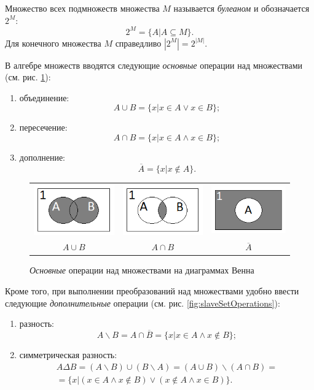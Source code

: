 Множество всех подмножеств множества $M$ называется \emph{булеаном} и обозначается $2^M$:
\[2^M=\{A|A\subseteq M\}.\]
Для конечного множества $M$ справедливо $\left|2^M\right|=2^{\left|M\right|}$.

В алгебре множеств вводятся следующие \emph{основные} операции над множествами (см. рис. \ref{fig:mainSetOperations}):
\begin{enumerate}
    \item объединение:\[A\cup B=\{x|x\in A \lor x\in B\};\]
    
    \item пересечение:\[A\cap B=\{x|x\in A \land x\in B\};\]
    
    \item дополнение:\[\overline{A}=\{x|x\not\in A\}.\]
\end{enumerate}

\begin{figure}
    \centering
    \begin{tabular}{||c||c||c||}
        \hline\hline
        \includegraphics[width=.2\textwidth]{fig/ABsetOr}
            & \includegraphics[width=.2\textwidth]{fig/ABsetAnd}
                & \includegraphics[width=.2\textwidth]{fig/AsetNot}\\
        $A\cup B$ 
            & $A\cap B$
                & $\overline{A}$\\
        \hline\hline
    \end{tabular}
    \caption{\emph{Основные} операции над множествами на диаграммах Венна}
    \label{fig:mainSetOperations}
\end{figure}

Кроме того, при выполнении преобразований над множествами удобно ввести следующие \emph{дополнительные} операции (см. рис. \ref{fig:slaveSetOperations}):
\begin{enumerate}
    \item разность:\[A\backslash B=A\cap\overline{B}=\{x|x\in A \land x\not\in B\};\]
    
    \item симметрическая разность:
    \[
    \begin{split}
        A\Delta B=(A\backslash B)\cup(B\backslash A)=(A\cup B)\backslash(A\cap B)=\\
        =\{x|(x\in A \land x\not\in B)\lor(x\not\in A\land x\in B)\}.
    \end{split}
    \]
\end{enumerate}

